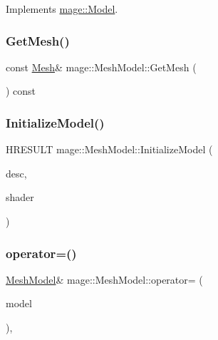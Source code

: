 Implements \hyperlink{classmage_1_1_model_ae5e9bee52da0db8c7a29920c13ed40ea}{mage\+::\+Model}.

\hypertarget{classmage_1_1_mesh_model_ab9a1c64ebb6b72cd6862e701983351c4}{}\label{classmage_1_1_mesh_model_ab9a1c64ebb6b72cd6862e701983351c4} 
\subsubsection{\texorpdfstring{Get\+Mesh()}{GetMesh()}}
{\footnotesize\ttfamily const \hyperlink{classmage_1_1_mesh}{Mesh}\& mage\+::\+Mesh\+Model\+::\+Get\+Mesh (\begin{DoxyParamCaption}{ }\end{DoxyParamCaption}) const}

\hypertarget{classmage_1_1_mesh_model_a9971552f5c866b8ed221df056c46a42d}{}\label{classmage_1_1_mesh_model_a9971552f5c866b8ed221df056c46a42d} 
\subsubsection{\texorpdfstring{Initialize\+Model()}{InitializeModel()}}
{\footnotesize\ttfamily H\+R\+E\+S\+U\+LT mage\+::\+Mesh\+Model\+::\+Initialize\+Model (\begin{DoxyParamCaption}\item[{const \hyperlink{classmage_1_1_model_descriptor}{Model\+Descriptor} \&}]{desc,  }\item[{const \hyperlink{structmage_1_1_combined_shader}{Combined\+Shader} \&}]{shader }\end{DoxyParamCaption})\hspace{0.3cm}{\ttfamily [private]}}

\hypertarget{classmage_1_1_mesh_model_a0cffe92f76d2470c67ae71a5a4046259}{}\label{classmage_1_1_mesh_model_a0cffe92f76d2470c67ae71a5a4046259} 
\subsubsection{\texorpdfstring{operator=()}{operator=()}}
{\footnotesize\ttfamily \hyperlink{classmage_1_1_mesh_model}{Mesh\+Model}\& mage\+::\+Mesh\+Model\+::operator= (\begin{DoxyParamCaption}\item[{const \hyperlink{classmage_1_1_mesh_model}{Mesh\+Model} \&}]{model }\end{DoxyParamCaption})\hspace{0.3cm}{\ttfamily [private]}, {\ttfamily [delete]}}

